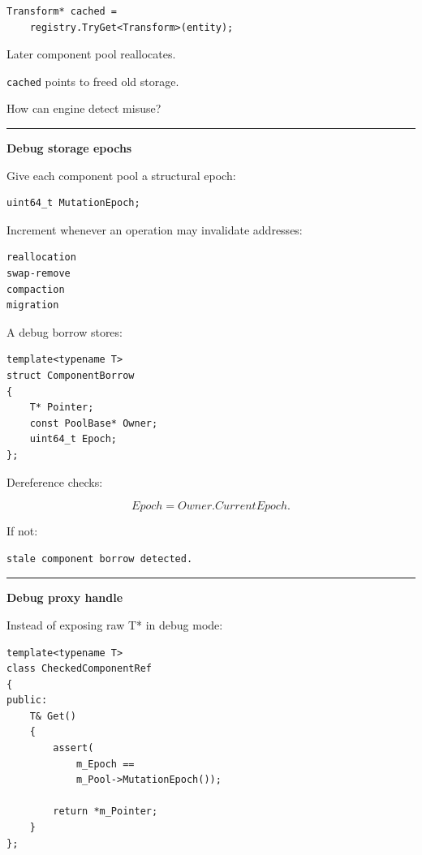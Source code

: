 \begin{verbatim}
Transform* cached =
    registry.TryGet<Transform>(entity);
\end{verbatim}

Later component pool reallocates.

\texttt{cached} points to freed old storage.

How can engine detect misuse?

\begin{center}\rule{0.5\linewidth}{0.5pt}\end{center}

\textbf{Debug storage epochs}

Give each component pool a structural epoch:

\begin{verbatim}
uint64_t MutationEpoch;
\end{verbatim}

Increment whenever an operation may invalidate addresses:

\begin{verbatim}
reallocation
swap-remove
compaction
migration
\end{verbatim}

A debug borrow stores:

\begin{verbatim}
template<typename T>
struct ComponentBorrow
{
    T* Pointer;
    const PoolBase* Owner;
    uint64_t Epoch;
};
\end{verbatim}

Dereference checks:

\[
Epoch=Owner.CurrentEpoch.
\]

If not:

\begin{verbatim}
stale component borrow detected.
\end{verbatim}

\begin{center}\rule{0.5\linewidth}{0.5pt}\end{center}

\textbf{Debug proxy handle}

Instead of exposing raw T* in debug mode:

\begin{verbatim}
template<typename T>
class CheckedComponentRef
{
public:
    T& Get()
    {
        assert(
            m_Epoch ==
            m_Pool->MutationEpoch());

        return *m_Pointer;
    }
};
\end{verbatim}

